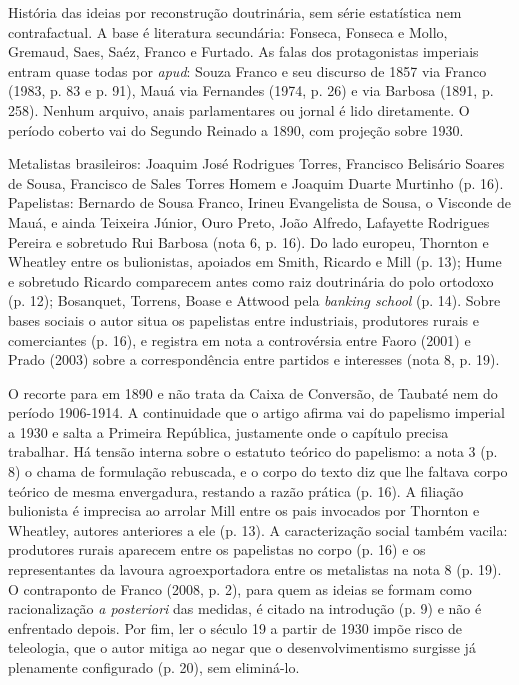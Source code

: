 História das ideias por reconstrução doutrinária, sem série estatística nem
contrafactual. A base é literatura secundária: Fonseca, Fonseca e Mollo,
Gremaud, Saes, Saéz, Franco e Furtado. As falas dos protagonistas imperiais
entram quase todas por \emph{apud}: Souza Franco e seu discurso de 1857 via
Franco (1983, p. 83 e p. 91), Mauá via Fernandes (1974, p. 26) e via Barbosa
(1891, p. 258). Nenhum arquivo, anais parlamentares ou jornal é lido
diretamente. O período coberto vai do Segundo Reinado a 1890, com projeção
sobre 1930.

Metalistas brasileiros: Joaquim José Rodrigues Torres, Francisco Belisário
Soares de Sousa, Francisco de Sales Torres Homem e Joaquim Duarte Murtinho (p.
16). Papelistas: Bernardo de Sousa Franco, Irineu Evangelista de Sousa, o
Visconde de Mauá, e ainda Teixeira Júnior, Ouro Preto, João Alfredo, Lafayette
Rodrigues Pereira e sobretudo Rui Barbosa (nota 6, p. 16). Do lado europeu,
Thornton e Wheatley entre os bulionistas, apoiados em Smith, Ricardo e Mill (p.
13); Hume e sobretudo Ricardo comparecem antes como raiz doutrinária do polo
ortodoxo (p. 12); Bosanquet, Torrens, Boase e Attwood pela \emph{banking
school} (p. 14). Sobre bases sociais o autor situa os papelistas entre industriais,
produtores rurais e comerciantes (p. 16), e registra em nota a controvérsia
entre Faoro (2001) e Prado (2003) sobre a correspondência entre partidos e
interesses (nota 8, p. 19).

O recorte para em 1890 e não trata da Caixa de Conversão, de Taubaté nem do
período 1906-1914. A continuidade que o artigo afirma vai do papelismo imperial
a 1930 e salta a Primeira República, justamente onde o capítulo precisa
trabalhar. Há tensão interna sobre o estatuto teórico do papelismo: a nota 3
(p. 8) o chama de formulação rebuscada, e o corpo do texto diz que lhe faltava
corpo teórico de mesma envergadura, restando a razão prática (p. 16). A
filiação bulionista é imprecisa ao arrolar Mill entre os pais invocados por
Thornton e Wheatley, autores anteriores a ele (p. 13). A caracterização social
também vacila: produtores rurais aparecem entre os papelistas no corpo (p. 16)
e os representantes da lavoura agroexportadora entre os metalistas na nota 8
(p. 19). O contraponto de Franco (2008, p. 2), para quem as ideias se formam
como racionalização \emph{a posteriori} das medidas, é citado na introdução (p.
9) e não é enfrentado depois. Por fim, ler o século 19 a partir de 1930 impõe
risco de teleologia, que o autor mitiga ao negar que o desenvolvimentismo
surgisse já plenamente configurado (p. 20), sem eliminá-lo.

